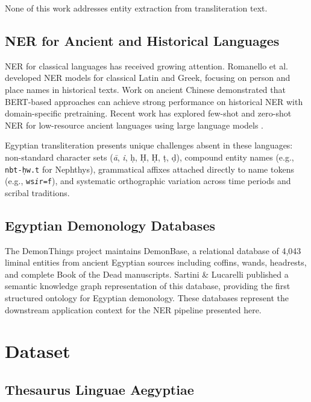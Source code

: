 \documentclass[11pt]{article}
\begin{document}
None of this work addresses entity extraction from transliteration text.

\subsection{NER for Ancient and Historical Languages}

NER for classical languages has received growing attention. Romanello et al.\ \cite{romanello2023} developed NER models for classical Latin and Greek, focusing on person and place names in historical texts. Work on ancient Chinese \cite{chisiec2024} demonstrated that BERT-based approaches can achieve strong performance on historical NER with domain-specific pretraining. Recent work has explored few-shot and zero-shot NER for low-resource ancient languages using large language models \cite{ml4al2024}.

Egyptian transliteration presents unique challenges absent in these languages: non-standard character sets (\textit{\=a}, \textit{i\kern-1pt{}}, \d{h}, \d{H}, \d{H}\kern-1pt{}, \d{t}, \d{d}), compound entity names (e.g., \texttt{nbt-\d{h}w.t} for Nephthys), grammatical affixes attached directly to name tokens (e.g., \texttt{ws\textit{i\kern-1pt{}}r=f}), and systematic orthographic variation across time periods and scribal traditions.

\subsection{Egyptian Demonology Databases}

The DemonThings project \cite{scalf} maintains DemonBase, a relational database of 4,043 liminal entities from ancient Egyptian sources including coffins, wands, headrests, and complete Book of the Dead manuscripts. Sartini \& Lucarelli \cite{sartini2024} published a semantic knowledge graph representation of this database, providing the first structured ontology for Egyptian demonology. These databases represent the downstream application context for the NER pipeline presented here.

\section{Dataset}

\subsection{Thesaurus Linguae Aegyptiae}
\end{document}
